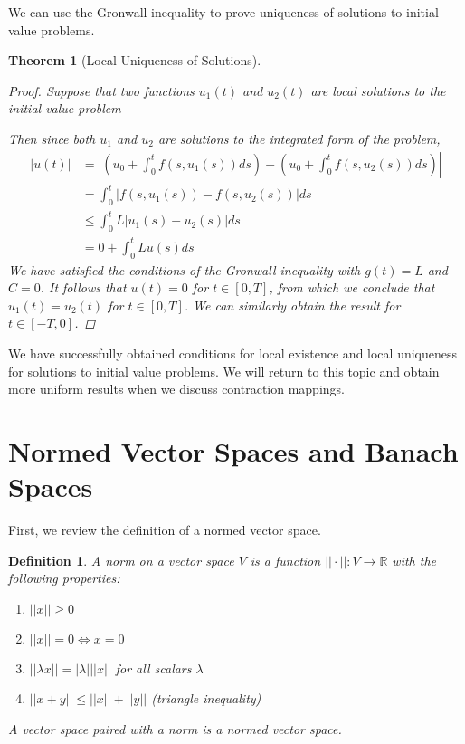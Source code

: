 \documentclass[12pt]{amsart}         %
\newtheorem{definition}{Definition}[section]
\newtheorem{theorem}{Theorem}[section]
\theoremstyle{remark}
\newcommand{\R}{\mathbb{R}}
\begin{document}
We can use the Gronwall inequality to prove uniqueness of solutions to initial value problems.

\begin{theorem}[Local Uniqueness of Solutions]
\begin{proof}
Suppose that two functions $u_1(t)$ and $u_2(t)$ are
local solutions to the initial value problem

Then since both $u_1$ and $u_2$ are solutions to the integrated form of the problem, 
\begin{align*}
|u(t)| &= \left| \left( u_0 + \int_0^t f(s, u_1(s))ds \right) - \left( u_0 + \int_0^t f(s, u_2(s))ds \right)  \right| \\
&= \int_0^t | f(s, u_1(s)) - f(s, u_2(s)) | ds \\
&\leq \int_0^t L |u_1(s) - u_2(s)| ds \\
&= 0 + \int_0^t L u(s) ds
\end{align*}
We have satisfied the conditions of the Gronwall inequality with $g(t) = L$ and $C = 0$. It follows that $u(t) = 0$ for $t \in [0, T]$, from which we conclude that $u_1(t) = u_2(t)$ for $t \in [0, T]$. We can similarly obtain the result for $t \in [-T,0]$.
\end{proof}
\end{theorem}

We have successfully obtained conditions for local existence and local uniqueness for solutions to initial value problems. We will return to this topic and obtain more uniform results when we discuss contraction mappings.

\section{Normed Vector Spaces and Banach Spaces}

First, we review the definition of a normed vector space.

\begin{definition}
A \emph{norm} on a vector space $V$ is a function $|| \cdot || : V \rightarrow \R$ with the following properties:
\begin{enumerate}
\item $|| x || \geq 0$
\item $||x|| = 0 \iff x = 0$
\item $||\lambda x|| = |\lambda|  ||x||$ for all scalars $\lambda$
\item $||x+y|| \leq ||x|| + ||y||$ (triangle inequality)
\end{enumerate}
A vector space paired with a norm is a \emph{normed vector space}.
\end{definition}
\end{document}
